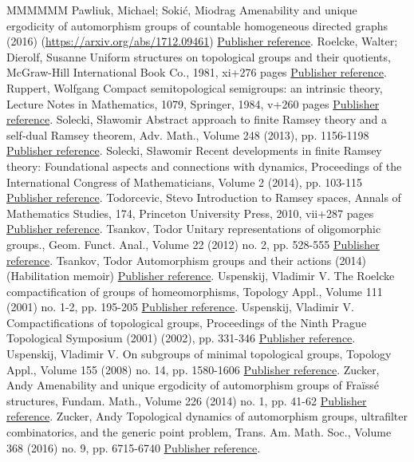 \begin{thebibliography}{MMMMMM}
 Pawliuk, Michael; Sokić, Miodrag Amenability and unique ergodicity of automorphism groups of countable homogeneous directed graphs (2016) (\url{https://arxiv.org/abs/1712.09461}) \href{https://ahl.centre-mersenne.org/item/AHL_2019__2__149_0/#PS}{Publisher reference}.
 Roelcke, Walter; Dierolf, Susanne Uniform structures on topological groups and their quotients, McGraw-Hill International Book Co., 1981, xi+276 pages \href{https://ahl.centre-mersenne.org/item/AHL_2019__2__149_0/#RD}{Publisher reference}.
 Ruppert, Wolfgang Compact semitopological semigroups: an intrinsic theory, Lecture Notes in Mathematics, 1079, Springer, 1984, v+260 pages \href{https://ahl.centre-mersenne.org/item/AHL_2019__2__149_0/#Ru}{Publisher reference}.
 Solecki, Sławomir Abstract approach to finite Ramsey theory and a self-dual Ramsey theorem, Adv. Math., Volume 248 (2013), pp. 1156-1198 \href{https://ahl.centre-mersenne.org/item/AHL_2019__2__149_0/#Sol4}{Publisher reference}.
 Solecki, Sławomir Recent developments in finite Ramsey theory: Foundational aspects and connections with dynamics, Proceedings of the International Congress of Mathematicians, Volume 2 (2014), pp. 103-115 \href{https://ahl.centre-mersenne.org/item/AHL_2019__2__149_0/#Sol6}{Publisher reference}.
 Todorcevic, Stevo Introduction to Ramsey spaces, Annals of Mathematics Studies, 174, Princeton University Press, 2010, vii+287 pages \href{https://ahl.centre-mersenne.org/item/AHL_2019__2__149_0/#T}{Publisher reference}.
 Tsankov, Todor Unitary representations of oligomorphic groups., Geom. Funct. Anal., Volume 22 (2012) no. 2, pp. 528-555 \href{https://ahl.centre-mersenne.org/item/AHL_2019__2__149_0/#Ts}{Publisher reference}.
 Tsankov, Todor Automorphism groups and their actions (2014) (Habilitation memoir) \href{https://ahl.centre-mersenne.org/item/AHL_2019__2__149_0/#Ts1}{Publisher reference}.
 Uspenskij, Vladimir V. The Roelcke compactification of groups of homeomorphisms, Topology Appl., Volume 111 (2001) no. 1-2, pp. 195-205 \href{https://ahl.centre-mersenne.org/item/AHL_2019__2__149_0/#Us3}{Publisher reference}.
 Uspenskij, Vladimir V. Compactifications of topological groups, Proceedings of the Ninth Prague Topological Symposium (2001) (2002), pp. 331-346 \href{https://ahl.centre-mersenne.org/item/AHL_2019__2__149_0/#Us4}{Publisher reference}.
 Uspenskij, Vladimir V. On subgroups of minimal topological groups, Topology Appl., Volume 155 (2008) no. 14, pp. 1580-1606 \href{https://ahl.centre-mersenne.org/item/AHL_2019__2__149_0/#Us5}{Publisher reference}.
 Zucker, Andy Amenability and unique ergodicity of automorphism groups of Fraïssé structures, Fundam. Math., Volume 226 (2014) no. 1, pp. 41-62 \href{https://ahl.centre-mersenne.org/item/AHL_2019__2__149_0/#Z1}{Publisher reference}.
 Zucker, Andy Topological dynamics of automorphism groups, ultrafilter combinatorics, and the generic point problem, Trans. Am. Math. Soc., Volume 368 (2016) no. 9, pp. 6715-6740 \href{https://ahl.centre-mersenne.org/item/AHL_2019__2__149_0/#Z2}{Publisher reference}.
\end{thebibliography}
